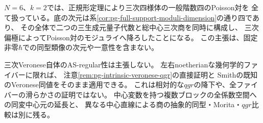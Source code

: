 \begin{remark}[三次四様体と比較の範囲]
\label{rem:pg-full-support-fourfold-scope}
$N=6$、$k=2$では、正規形定理により三次四様体の一般階数四のPoisson対を
全て扱っている。底の次元は系\ref{cor:pg-full-support-moduli-dimension}の通り四であり、
その全体で二つの三生成元量子代数と総中心三次商を同時に構成し、
三次偏極によってPoisson対のモジュライへ降ろしたことになる。
この主張は、固定非零$\hbar$での同型類像の次元や一意性を含まない。

三次Veronese自体のAS-regular性は主張しない。
左右noetherianな幾何学的ファイバーに限れば、
注意\ref{rem:pg-intrinsic-veronese-qgr}の直接証明と
Smithの既知のVeronese同値\cite{PSmithVeronese}をそのまま適用できる。
これは相対的な$qgr$の降下や、全ファイバーの滑らかさの証明ではない。
中心変数を持つ複数ブロックの全係数空間への同変中心元の延長と、
異なる中心直線による商の抽象的同型・Morita・$qgr$比較は別に残る。
\end{remark}
